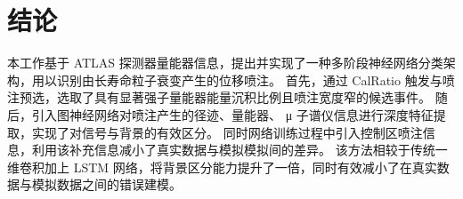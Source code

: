 
\chapter{结论}
本工作基于 ATLAS 探测器量能器信息，提出并实现了一种多阶段神经网络分类架构，用以识别由长寿命粒子衰变产生的位移喷注。
首先，通过 CalRatio 触发与喷注预选，选取了具有显著强子量能器能量沉积比例且喷注宽度窄的候选事件。
随后，引入图神经网络对喷注产生的径迹、量能器、 μ 子谱仪信息进行深度特征提取，实现了对信号与背景的有效区分。
同时网络训练过程中引入控制区喷注信息，利用该补充信息减小了真实数据与模拟模拟间的差异。
该方法相较于传统一维卷积加上 LSTM 网络，将背景区分能力提升了一倍，同时有效减小了在真实数据与模拟数据之间的错误建模。
